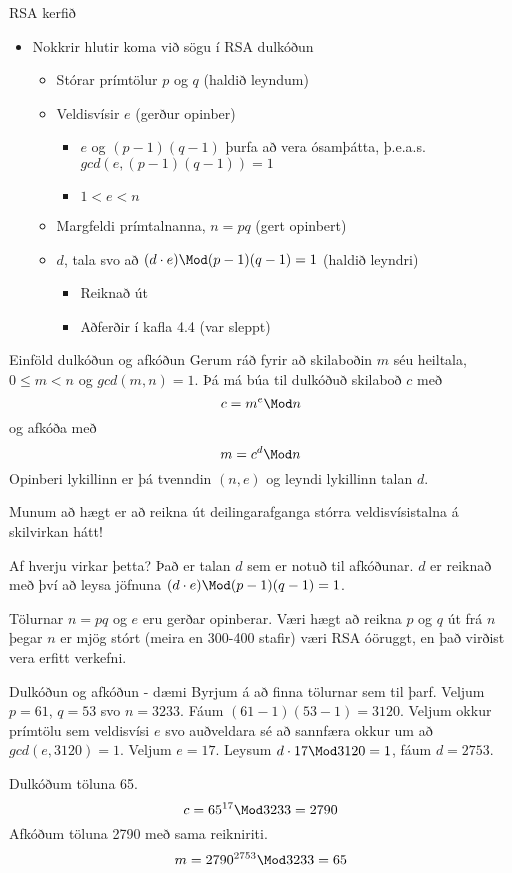 \documentclass{beamer}
\begin{document}
\begin{frame}{RSA kerfið}
\begin{itemize}
 \item Nokkrir hlutir koma við sögu í RSA dulkóðun
 \begin{itemize}
  \item Stórar prímtölur $p$ og $q$ (haldið leyndum)
  \item Veldisvísir $e$ (gerður opinber)
  \begin{itemize}
   \item $e$ og $(p-1)(q-1)$ þurfa að vera ósamþátta, þ.e.a.s. $gcd(e, (p-1)(q-1)) = 1$
   \item $1 < e < n$
  \end{itemize}
  \item Margfeldi prímtalnanna, $n = pq$ (gert opinbert)
  \item $d$, tala svo að $(d\cdot e) \Mod (p-1)(q-1) = 1$ (haldið leyndri)
  \begin{itemize}
   \item Reiknað út
   \item Aðferðir í kafla 4.4 (var sleppt)
  \end{itemize}
 \end{itemize}
\end{itemize}
\end{frame}

\begin{frame}{Einföld dulkóðun og afkóðun}
Gerum ráð fyrir að skilaboðin $m$ séu heiltala, $0 \leq m < n$ og $gcd(m, n) = 1$. Þá má búa til dulkóðuð skilaboð $c$ með
\[
c = m^e \Mod n
\]
og afkóða með 
\[
 m = c^d \Mod n
\]
Opinberi lykillinn er þá tvenndin $(n, e)$ og leyndi lykillinn talan $d$.

Munum að hægt er að reikna út deilingarafganga stórra veldisvísistalna á skilvirkan hátt!
\end{frame}

\begin{frame}{Af hverju virkar þetta?}
Það er talan $d$ sem er notuð til afkóðunar. $d$ er reiknað með því að leysa jöfnuna $(d\cdot e) \Mod (p-1)(q-1) = 1$.

Tölurnar $n = pq$ og $e$ eru gerðar opinberar. Væri hægt að reikna $p$ og $q$ út frá $n$ þegar $n$ er mjög stórt (meira en 300-400 stafir) væri RSA óöruggt, en það virðist vera erfitt verkefni.
\end{frame}

\begin{frame}{Dulkóðun og afkóðun - dæmi}
Byrjum á að finna tölurnar sem til þarf. Veljum $p=61$, $q = 53$ svo $n = 3233$. Fáum $(61 - 1)(53 - 1) = 3120$. Veljum okkur prímtölu sem veldisvísi $e$ svo auðveldara sé að sannfæra okkur um að $gcd(e,3120)=1$. Veljum $e = 17$. Leysum $d \cdot 17 \Mod 3120 = 1$, fáum $d = 2753$.

Dulkóðum töluna 65.
\[
 c = 65^{17} \Mod 3233 = 2790
\]
Afkóðum töluna 2790 með sama reikniriti.
\[
 m = 2790^{2753} \Mod 3233 = 65
\]


\end{frame}
\end{document}
